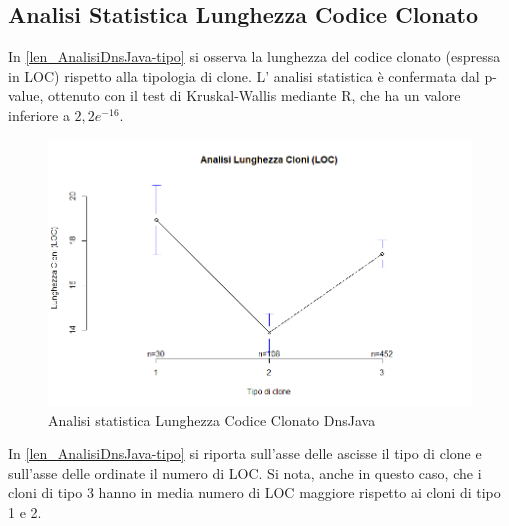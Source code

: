 \subsection{Analisi Statistica Lunghezza Codice Clonato}
In \autoref{len_AnalisiDnsJava-tipo} si osserva la lunghezza del codice clonato (espressa in LOC) rispetto alla tipologia di clone. L' analisi statistica è confermata dal p-value, ottenuto con il test di Kruskal-Wallis mediante R, che ha un valore inferiore a $2,2 e^{-16}$. \newpage
\begin{figure}[htbp]
	\centering
	\includegraphics[scale=0.5]{analisi_R/AnalisiDnsJava/3-gplot-len-type.png}
\caption{Analisi statistica Lunghezza Codice Clonato DnsJava}
\label{len_AnalisiDnsJava-tipo}
\end{figure}
In \autoref{len_AnalisiDnsJava-tipo} si riporta sull'asse delle ascisse il tipo di clone e sull'asse delle ordinate il numero di LOC. Si nota, anche in questo caso, che i cloni di tipo 3 hanno in media numero di LOC maggiore rispetto ai cloni di tipo 1 e 2.